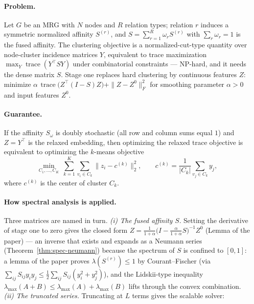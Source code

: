 \paragraph{Problem.}
Let $G$ be an MRG with $N$ nodes and $R$ relation types; relation $r$ induces
a symmetric normalized affinity $S^{(r)}$, and $S = \sum_{r=1}^{R} \omega_r
S^{(r)}$ with $\sum_r \omega_r = 1$ is the fused affinity. The clustering
objective is a normalized-cut-type quantity over node-cluster incidence
matrices $Y$, equivalent to trace maximization $\max_Y
\operatorname{trace}(Y^{\top}\!SY)$ under combinatorial constraints ---
NP-hard, and it needs the dense matrix $S$. Stage one replaces hard
clustering by continuous features $Z$: minimize $\alpha\,
\operatorname{trace}\bigl(Z^{\top}(I - S)Z\bigr) + \|Z - Z^0\|_F^2$ for
smoothing parameter $\alpha > 0$ and input features $Z^0$.

\paragraph{Guarantee.}

\begin{theorem}\label{thm:spec-mrg-kmeans}
If the affinity $S_\omega$ is doubly stochastic (all row and column sums
equal $1$) and $Z = Y^{\top}$ is the relaxed embedding, then optimizing the
relaxed trace objective is equivalent to optimizing the $k$-means objective
\[
\min_{C_1,\dots,C_K}\ \sum_{k=1}^{K} \sum_{v_i \in C_k}
\bigl\| z_i - c^{(k)} \bigr\|_2^2,
\qquad
c^{(k)} = \frac{1}{|C_k|} \sum_{v_j \in C_k} y_j ,
\]
where $c^{(k)}$ is the center of cluster $C_k$. \eop
\end{theorem}

\paragraph{How spectral analysis is applied.}
Three matrices are named in turn. \emph{(i) The fused affinity $S$.} Setting
the derivative of stage one to zero gives the closed form $Z =
\frac{1}{1+\alpha}\bigl(I - \frac{\alpha}{1+\alpha} S\bigr)^{-1} Z^0$
(Lemma of the paper) --- an inverse that exists and expands as a Neumann
series (Theorem~\ref{thm:spec-neumann}) because the spectrum of $S$ is
confined to $[0,1]$: a lemma of the paper proves $\lambda(S^{(r)}) \le 1$
by Courant--Fischer (via $\sum_{ij} S_{ij} y_i y_j \le \frac{1}{2}
\sum_{ij} S_{ij}(y_i^2 + y_j^2)$), and the Lidskii-type inequality
$\lambda_{\max}(A + B) \le \lambda_{\max}(A) + \lambda_{\max}(B)$ lifts
through the convex combination. \emph{(ii) The truncated series.}
Truncating at $L$ terms gives the scalable solver:

